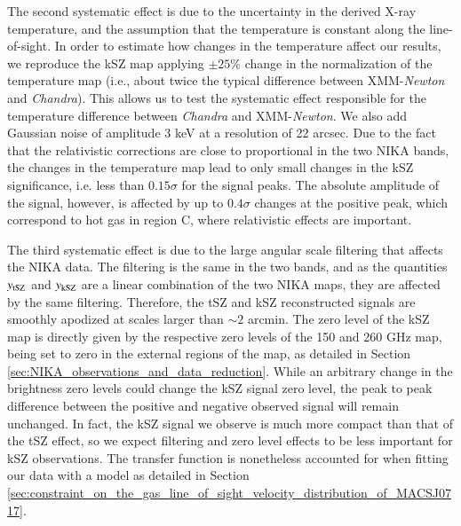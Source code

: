 \documentclass[twocolumn,traditabstract]{aa}
\begin{document}
The second systematic effect is due to the uncertainty in the derived X-ray temperature, and the assumption that the temperature is constant along the line-of-sight. In order to estimate how changes in the temperature affect our results, we reproduce the kSZ map applying $\pm 25$\% change in the normalization of the temperature map (i.e., about twice the typical difference between XMM-\textit{Newton} and \textit{Chandra}). This allows us to test the systematic effect responsible for the temperature difference between \textit{Chandra} and XMM-\textit{Newton}. We also add Gaussian noise of amplitude 3 keV at a resolution of 22 arcsec. Due to the fact that the relativistic corrections are close to proportional in the two NIKA bands, the changes in the temperature map lead to only small changes in the kSZ significance, i.e. less than $0.15 \sigma$ for the signal peaks. The absolute amplitude of the signal, however, is affected by up to $0.4 \sigma$ changes at the positive peak, which correspond to hot gas in region C, where relativistic effects are important.

The third systematic effect is due to the large angular scale filtering that affects the NIKA data. The filtering is the same in the two bands, and as the quantities $y_{\rm tSZ}$ and $y_{\rm kSZ}$ are a linear combination of the two NIKA maps, they are affected by the same filtering. Therefore, the tSZ and kSZ reconstructed signals are smoothly apodized at scales larger than $\sim 2$ arcmin. The zero level of the kSZ map is directly given by the respective zero levels of the 150 and 260 GHz map, being set to zero in the external regions of the map, as detailed in Section \ref{sec:NIKA_observations_and_data_reduction}. While an arbitrary change in the brightness zero levels could change the kSZ signal zero level, the peak to peak difference between the positive and negative observed signal will remain unchanged. In fact, the kSZ signal we observe is much more compact than that of the tSZ effect, so we expect filtering and zero level effects to be less important for kSZ observations. The transfer function is nonetheless accounted for when fitting our data with a model as detailed in Section \ref{sec:constraint_on_the_gas_line_of_sight_velocity_distribution_of_MACSJ0717}.

\end{document}
